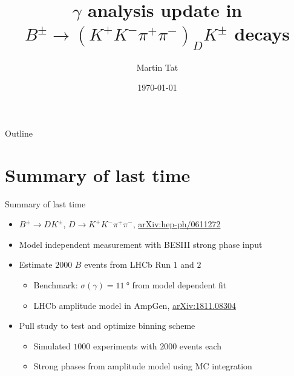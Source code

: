 \documentclass{beamer}
\title[$B^\pm\to(K^+K^-\pi^+\pi^-)_DK^\pm$]{\texorpdfstring{$\gamma$}{gamma} analysis update in \texorpdfstring{$B^\pm\to(K^+K^-\pi^+\pi^-)_DK^\pm$}{B to K+K-pi+pi-} decays}
\author{Martin Tat}
\institute{Oxford LHCb}
\date{\today}
\begin{document}
\begin{frame}
  \titlepage
\end{frame}

\begin{frame}{Outline}
  \tableofcontents
\end{frame}

\section{Summary of last time}
\begin{frame}{Summary of last time}
  \begin{itemize}
    \setlength\itemsep{1.2em}
    \item{$B^\pm\to DK^\pm$, $D\to K^+K^-\pi^+\pi^-$, \href{https://arxiv.org/abs/hep-ph/0611272}{arXiv:hep-ph/0611272}}
    \item{Model independent measurement with BESIII strong phase input}
    \item{Estimate $2000$ $B$ events from LHCb Run $1$ and $2$}
    \begin{itemize}
      \item{Benchmark: $\sigma(\gamma) = \SI{11}{\degree}$ from model dependent fit}
      \item{LHCb amplitude model in AmpGen, \href{https://arxiv.org/abs/1811.08304}{arXiv:1811.08304}}
    \end{itemize}
    \item{Pull study to test and optimize binning scheme}
    \begin{itemize}
      \item{Simulated $1000$ experiments with $2000$ events each}
      \item{Strong phases from amplitude model using MC integration}
    \end{itemize}
  \end{itemize}
\end{frame}
\end{document}
